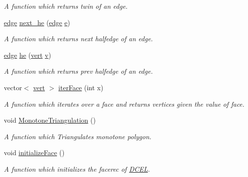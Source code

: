 \begin{DoxyCompactItemize}
\begin{DoxyCompactList}\small\item\em A function which returns twin of an edge. \end{DoxyCompactList}\item 
\hyperlink{_polygon_triangulation_8h_a4ef43ff5c6d42dacbc8ffd9c8cfdc189}{edge} \hyperlink{class_d_c_e_l_a384c90222cc7e6a09ba47d66e9e11df8}{next\+\_\+he} (\hyperlink{_polygon_triangulation_8h_a4ef43ff5c6d42dacbc8ffd9c8cfdc189}{edge} \hyperlink{_polygon_triangulation_8h_af4fe7231ba50bcef9e679a62325dea81}{e})
\begin{DoxyCompactList}\small\item\em A function which returns next halfedge of an edge. \end{DoxyCompactList}\item 
\hyperlink{_polygon_triangulation_8h_a4ef43ff5c6d42dacbc8ffd9c8cfdc189}{edge} \hyperlink{class_d_c_e_l_abc4ba3118faae5afdebc3a180daa4789}{he} (\hyperlink{_polygon_triangulation_8h_a15bccd83c1e570e4a0ff17c42152989b}{vert} \hyperlink{_polygon_triangulation_8h_a6ef2f6631c3d06ff06abb262179de4c1}{v})
\begin{DoxyCompactList}\small\item\em A function which returns prev halfedge of an edge. \end{DoxyCompactList}\item 
vector$<$ \hyperlink{_polygon_triangulation_8h_a15bccd83c1e570e4a0ff17c42152989b}{vert} $>$ \hyperlink{class_d_c_e_l_a746b067777dfc25859a7082f27a1364e}{iter\+Face} (int x)
\begin{DoxyCompactList}\small\item\em A function which iterates over a face and returns vertices given the value of face. \end{DoxyCompactList}\item 
void \hyperlink{class_d_c_e_l_a989e872e63f1d245aca75ffae6d5c608}{Monotone\+Triangulation} ()
\begin{DoxyCompactList}\small\item\em A function which Triangulates monotone polygon. \end{DoxyCompactList}\item 
void \hyperlink{class_d_c_e_l_a886263abba0d84b7e459a6acb5c594ae}{initialize\+Face} ()
\begin{DoxyCompactList}\small\item\em A function which initializes the facerec of \hyperlink{class_d_c_e_l}{D\+C\+EL}. \end{DoxyCompactList}\item 

\end{DoxyCompactItemize}

